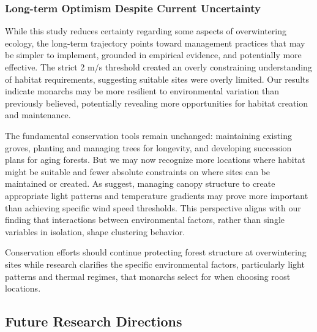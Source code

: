\subsubsection{Long-term Optimism Despite Current Uncertainty}

While this study reduces certainty regarding some aspects of overwintering ecology, the long-term trajectory points toward management practices that may be simpler to implement, grounded in empirical evidence, and potentially more effective. The strict 2 m/s threshold created an overly constraining understanding of habitat requirements, suggesting suitable sites were overly limited. Our results indicate monarchs may be more resilient to environmental variation than previously believed, potentially revealing more opportunities for habitat creation and maintenance.

The fundamental conservation tools remain unchanged: maintaining existing groves, planting and managing trees for longevity, and developing succession plans for aging forests. But we may now recognize more locations where habitat might be suitable and fewer absolute constraints on where sites can be maintained or created. As \textcite{sanieeHierarchyScaleInfluence2022} suggest, managing canopy structure to create appropriate light patterns and temperature gradients may prove more important than achieving specific wind speed thresholds. This perspective aligns with our finding that interactions between environmental factors, rather than single variables in isolation, shape clustering behavior.

Conservation efforts should continue protecting forest structure at overwintering sites while research clarifies the specific environmental factors, particularly light patterns and thermal regimes, that monarchs select for when choosing roost locations.

\subsection{Future Research Directions}

